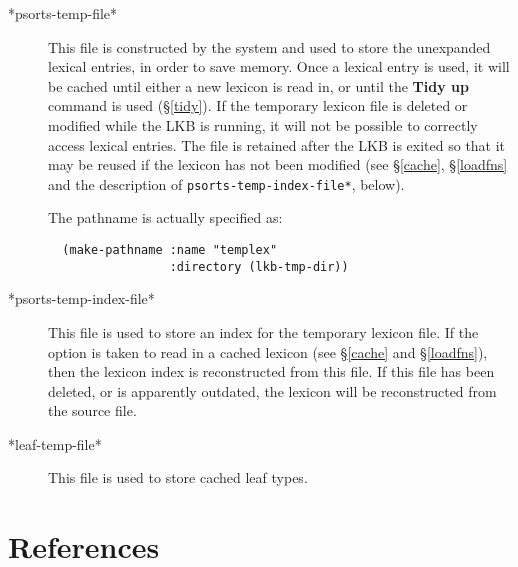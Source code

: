 \documentclass[12pt]{report}
\newcommand{\lkbparam}[1]{{\tt #1}}
\newcommand{\lkbmenucommand}{\bf}
\begin{document}
\begin{description}
\item[*psorts-temp-file*]
This file is constructed by the system and used to store the unexpanded lexical
entries, in order to save memory.  Once a lexical entry is used, it will
be cached until either a new lexicon is read in, or until the {\lkbmenucommand Tidy up}
command is used (\S\ref{tidy}).  If the temporary
lexicon file is deleted or modified while the LKB is running, it will not
be possible to correctly access lexical entries.  The file is retained
after the LKB is exited so that it may be reused if the lexicon has not been 
modified (see \S\ref{cache}, \S\ref{loadfns} and the description of 
\lkbparam{*psorts-temp-index-file*}, below).

The pathname is actually specified as:
\begin{verbatim}
  (make-pathname :name "templex" 
                 :directory (lkb-tmp-dir))
\end{verbatim}

\item[*psorts-temp-index-file*]
This file is used to store an index for the temporary lexicon file.
If the option is taken to read in a cached lexicon (see \S\ref{cache}
and \S\ref{loadfns}),
then the lexicon index is reconstructed from this file.
If this file has been deleted, or is apparently outdated, the lexicon
will be reconstructed from the source file.
\item[*leaf-temp-file*]
This file is used to store cached leaf types.
\end{description}


\chapter*{References}
\end{document}
